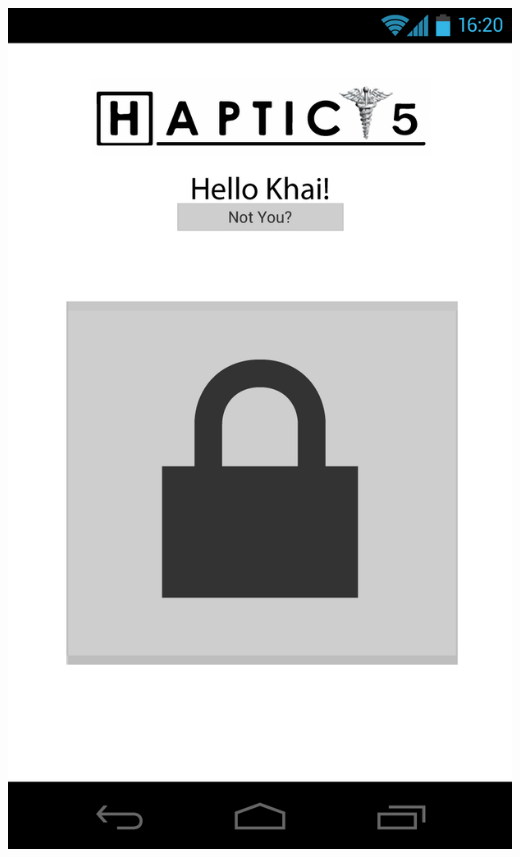 \documentclass[pdftex,12pt,a4paper]{report}
\begin{document}
\begin{center}
	\includegraphics[scale=0.18]{Screens/00-Lock.png}

\end{center}
\end{document}

